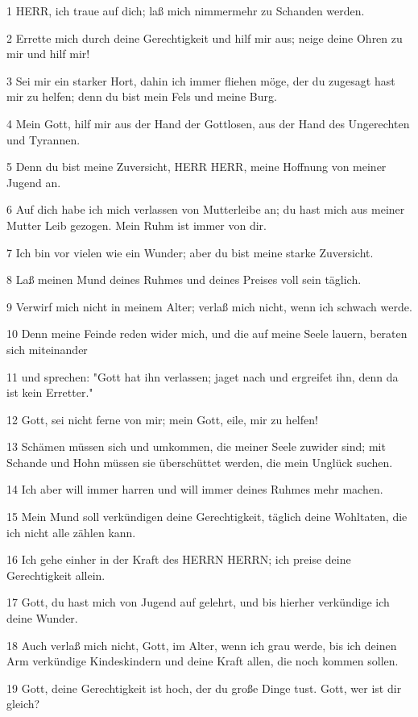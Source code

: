 \par 1 HERR, ich traue auf dich; laß mich nimmermehr zu Schanden werden.
\par 2 Errette mich durch deine Gerechtigkeit und hilf mir aus; neige deine Ohren zu mir und hilf mir!
\par 3 Sei mir ein starker Hort, dahin ich immer fliehen möge, der du zugesagt hast mir zu helfen; denn du bist mein Fels und meine Burg.
\par 4 Mein Gott, hilf mir aus der Hand der Gottlosen, aus der Hand des Ungerechten und Tyrannen.
\par 5 Denn du bist meine Zuversicht, HERR HERR, meine Hoffnung von meiner Jugend an.
\par 6 Auf dich habe ich mich verlassen von Mutterleibe an; du hast mich aus meiner Mutter Leib gezogen. Mein Ruhm ist immer von dir.
\par 7 Ich bin vor vielen wie ein Wunder; aber du bist meine starke Zuversicht.
\par 8 Laß meinen Mund deines Ruhmes und deines Preises voll sein täglich.
\par 9 Verwirf mich nicht in meinem Alter; verlaß mich nicht, wenn ich schwach werde.
\par 10 Denn meine Feinde reden wider mich, und die auf meine Seele lauern, beraten sich miteinander
\par 11 und sprechen: "Gott hat ihn verlassen; jaget nach und ergreifet ihn, denn da ist kein Erretter."
\par 12 Gott, sei nicht ferne von mir; mein Gott, eile, mir zu helfen!
\par 13 Schämen müssen sich und umkommen, die meiner Seele zuwider sind; mit Schande und Hohn müssen sie überschüttet werden, die mein Unglück suchen.
\par 14 Ich aber will immer harren und will immer deines Ruhmes mehr machen.
\par 15 Mein Mund soll verkündigen deine Gerechtigkeit, täglich deine Wohltaten, die ich nicht alle zählen kann.
\par 16 Ich gehe einher in der Kraft des HERRN HERRN; ich preise deine Gerechtigkeit allein.
\par 17 Gott, du hast mich von Jugend auf gelehrt, und bis hierher verkündige ich deine Wunder.
\par 18 Auch verlaß mich nicht, Gott, im Alter, wenn ich grau werde, bis ich deinen Arm verkündige Kindeskindern und deine Kraft allen, die noch kommen sollen.
\par 19 Gott, deine Gerechtigkeit ist hoch, der du große Dinge tust. Gott, wer ist dir gleich?
